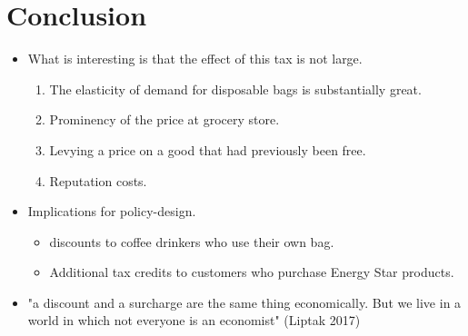 \documentclass[../root]{subfiles}
\begin{document}
    \section{Conclusion}

    \begin{itemize}
      \item What is interesting is that the effect of this tax is not large.
      \begin{enumerate}
        \item The elasticity of demand for disposable bags is substantially great.
        \item Prominency of the price at grocery store.
        \item Levying a price on a good that had previously been free.
        \item Reputation costs.
      \end{enumerate}
      \item Implications for policy-design.
      \begin{itemize}
        \item discounts to coffee drinkers who use their own bag.
        \item Additional tax credits to customers who purchase Energy Star products.
      \end{itemize}
      \item "a discount and a surcharge are the same thing economically. But we live in a world in which not everyone is an economist" (Liptak 2017)
    \end{itemize}



    \biblio
\end{document}

